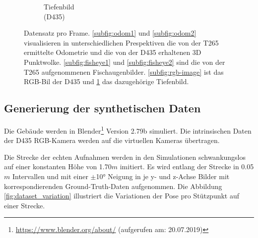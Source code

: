 \begin{figure}[H]
\begin{subfigure}[t]{0.3\linewidth}
		\caption{Tiefenbild \\ (D435) \hspace*{2cm}}
		\label{subfig:depth-image}
	\end{subfigure}
	\caption{Datensatz pro Frame. \ref{subfig:odom1}  und \ref{subfig:odom2} visualisieren in unterschiedlichen Prespektiven die von der T265 ermittelte Odometrie und die von der D435 erhaltenen 3D Punktwolke. \ref{subfig:fisheye1} und \ref{subfig:fisheye2} sind die von der T265 aufgenommenen Fischaugenbilder. \ref{subfig:rgb-image} ist das RGB-Bil der D435 und \ref{subfig:depth-image} das dazugehörige Tiefenbild. }
	\label{fig:dataset}
\end{figure}


\subsection{Generierung der synthetischen Daten}
\label{subsec:generate_synth_images}

Die Gebäude werden in Blender\footnote{\url{https://www.blender.org/about/} (aufgerufen am: 20.07.2019)} Version 2.79b simuliert. Die intrinsischen Daten der D435 RGB-Kamera werden auf die virtuellen Kameras übertragen.

Die Strecke der echten Aufnahmen werden in den Simulationen schwankungslos auf einer konstanten Höhe von 1.70$m$ imitiert. Es wird entlang der Strecke in 0.05$m$ Intervallen und mit einer $\pm$10° Neigung in je y- und z-Achse Bilder mit korrespondierenden Ground-Truth-Daten aufgenommen. Die Abbildung \ref{fig:dataset_variation} illustriert die Variationen der Pose pro Stützpunkt auf einer Strecke.


